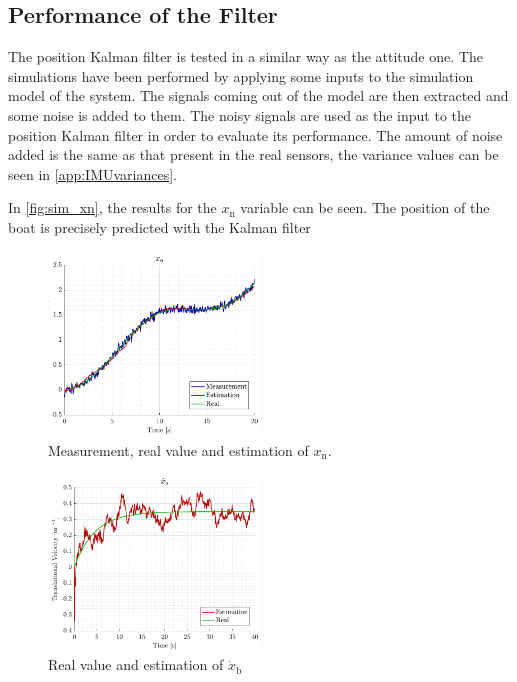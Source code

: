 \subsection{Performance of the Filter}
The position Kalman filter is tested in a similar way as the attitude one. The simulations have been performed by applying some inputs to the simulation model of the system. The signals coming out of the model are then extracted and some noise is added to them. The noisy signals are used as the input to the position Kalman filter in order to evaluate its performance. The amount of noise added is the same as that present in the real sensors, the variance values can be seen in \autoref{app:IMUvariances}.


In \autoref{fig:sim_xn}, the results for the $x_\mathrm{n}$ variable can be seen. The position of the boat is precisely predicted with the Kalman filter
\begin{figure}[H]
    \includegraphics[width=0.5\textwidth]{figures/sim_xn}
    \caption{Measurement, real value and estimation of $x_\mathrm{n}$.}
    \label{fig:sim_xn}
\end{figure}


\begin{figure}[H]
    \includegraphics[width=0.5\textwidth]{figures/sim_xbdot}
    \caption{Real value and estimation of $\dot{x}_\mathrm{b}$}
    \label{fig:sim_xbdot}
\end{figure}


